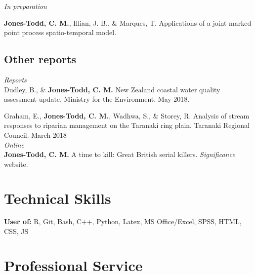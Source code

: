 \documentclass[10pt,a4paper]{moderncv}
\begin{document}
\textit{\small{In preparation}}\\

\vspace{-3pt}

\textbf{Jones-Todd, C. M.}, Illian, J. B., \& Marques, T. Applications of a joint marked point process spatio-temporal model.\\



\subsection{Other reports}

\vspace{5pt}

\textit{\small{Reports}}\\

Dudley, B., \& \textbf{Jones-Todd, C. M.} New Zealand coastal water quality assessment update. Ministry for the Environment. May 2018.

\vspace{5pt}

Graham, E., \textbf{Jones-Todd, C. M.}, Wadhwa, S., \& Storey, R. Analysis of stream responses to riparian management on the Taranaki ring plain. Taranaki Regional Council. March 2018\\

\textit{\small{Online}}\\

\textbf{Jones-Todd, C. M.} A time to kill: Great British serial killers. \textit{Significance} website.

\vspace{5pt}


\newpage

\section{Technical Skills}

\vspace{6pt}
    \textbf{User of:} R, Git, Bash, C++, Python, Latex, MS Office/Excel, SPSS, HTML, CSS, JS


\section{Professional Service}

\vspace{6pt}
\end{document}
